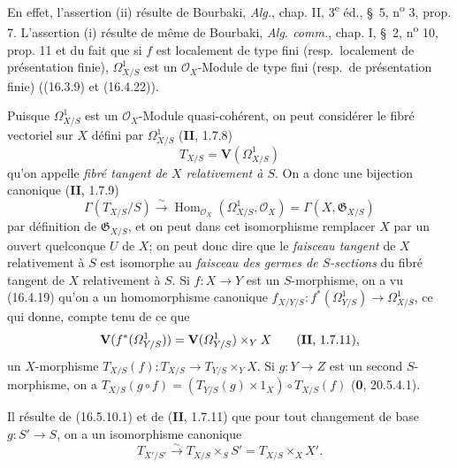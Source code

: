 En effet, l'assertion (ii) résulte de Bourbaki, \emph{Alg.}, chap. II,
3\textsuperscript{e} éd., \S~5, n\textsuperscript{o} 3, prop. 7. L'assertion
(i) résulte de même de Bourbaki, \emph{Alg. comm.}, chap. I, \S~2,
n\textsuperscript{o} 10, prop. 11 et du fait que si $f$ est localement de type
fini (resp.\ localement de présentation finie), $\varOmega_{X/S}^1$ est un
$\mathcal{O}_X$-Module de type fini (resp.\ de présentation finie) ((16.3.9)
et (16.4.22)).

\begin{env}[16.5.12]
Puisque $\varOmega_{X/S}^1$ est un $\mathcal{O}_X$-Module quasi-cohérent, on peut
considérer le fibré vectoriel sur $X$ défini par $\varOmega_{X/S}^1$
(\textbf{II}, 1.7.8)
\[
  T_{X/S}=\mathbf{V}(\varOmega_{X/S}^1)
  \tag{16.5.12.1}
  \label{IV.16.5.12.1}
\]
qu'on appelle \emph{fibré tangent de $X$ relativement à $S$}. On a donc une
bijection canonique (\textbf{II}, 1.7.9)
\[
  \Gamma(T_{X/S}/S)\xrightarrow{\sim}
  \operatorname{Hom}_{\mathcal{O}_X}(\varOmega_{X/S}^1,\mathcal{O}_X)
  =\Gamma(X,\mathfrak{G}_{X/S})
\]
par définition de $\mathfrak{G}_{X/S}$, et on peut dans cet isomorphisme
remplacer $X$ par un ouvert quelconque $U$ de $X$; on peut donc dire que le
\emph{faisceau tangent} de $X$ relativement à $S$ est isomorphe au
\emph{faisceau des germes de $S$-sections} du fibré tangent de $X$
relativement à $S$. Si $f:X\to Y$ est un $S$-morphisme, on a vu (16.4.19)
qu'on a un homomorphisme canonique
$f_{X/Y/S}:f^*(\varOmega_{Y/S}^1)\to\varOmega_{X/S}^1$, ce qui donne, compte tenu de
ce que
\[
  \mathbf{V}(f^*(\varOmega_{Y/S}^1))
  =\mathbf{V}(\varOmega_{Y/S}^1)\times_Y X\qquad\text{(\textbf{II}, 1.7.11),}
\]
un $X$-morphisme
$T_{X/S}(f):T_{X/S}\to T_{Y/S}\times_Y X$. Si $g:Y\to Z$ est un second
$S$-morphisme, on a
$T_{X/S}(g\circ f)=(T_{Y/S}(g)\times1_X)\circ T_{X/S}(f)$ (\textbf{0}, 20.5.4.1).

Il résulte de (16.5.10.1) et de (\textbf{II}, 1.7.11) que pour tout changement de base
$g:S'\to S$, on a un isomorphisme canonique
\[
  T_{X'/S'}\xrightarrow{\sim}T_{X/S}\times_S S'
  =T_{X/S}\times_X X'.
  \tag{16.5.12.2}
  \label{IV.16.5.12.2}
\]
\end{env}


